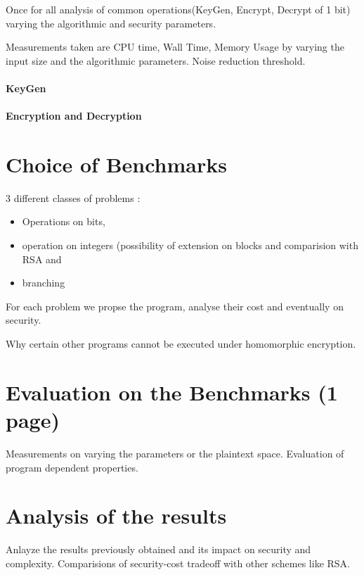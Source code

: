 \documentclass{acm_proc_article-sp}
\begin{document}
Once for all analysis of common operations(KeyGen, Encrypt, Decrypt of 1 bit) varying the algorithmic and security parameters.


Measurements taken are CPU time, Wall Time, Memory Usage by varying the input size  and the algorithmic parameters. Noise reduction threshold.

\paragraph{KeyGen}


\paragraph{Encryption and Decryption}

\section{Choice of Benchmarks}

3 different classes of problems : 
\begin{itemize}
\item Operations on bits,
 \item operation on integers (possibility of extension on blocks and comparision with RSA and 
 \item branching
\end{itemize}

For each problem we propse the program, analyse their cost and eventually on security.

Why certain other programs cannot be executed under homomorphic encryption.

\section{Evaluation on the Benchmarks (1 page)}

Measurements on varying the parameters or the plaintext space. Evaluation of program dependent properties. 

\section{Analysis of the results}

Anlayze the results previously obtained and its impact on security and complexity. Comparisions of security-cost tradeoff with other schemes like RSA.
\end{document}
